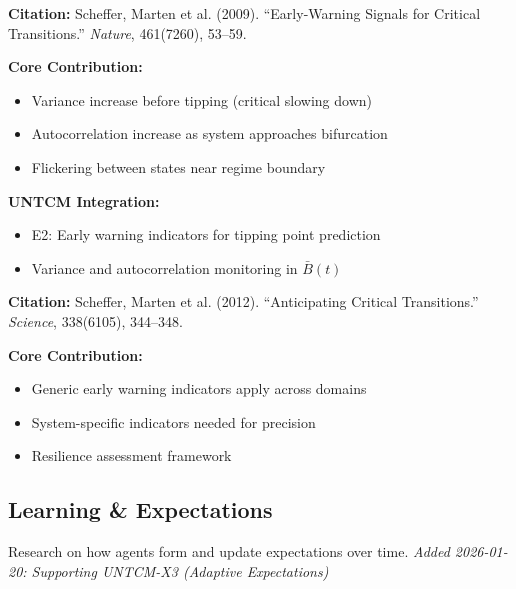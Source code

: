 \begin{tcolorbox}[colback=yellow!5!white,colframe=yellow!75!black,title=Key Paper: Scheffer et al. (2009)]
\textbf{Citation:} Scheffer, Marten et al. (2009). ``Early-Warning Signals for Critical Transitions.'' \textit{Nature}, 461(7260), 53--59.

\textbf{Core Contribution:}
\begin{itemize}[nosep]
    \item Variance increase before tipping (critical slowing down)
    \item Autocorrelation increase as system approaches bifurcation
    \item Flickering between states near regime boundary
\end{itemize}

\textbf{UNTCM Integration:}
\begin{itemize}[nosep]
    \item E2: Early warning indicators for tipping point prediction
    \item Variance and autocorrelation monitoring in $\bar{B}(t)$
\end{itemize}
\end{tcolorbox}

\begin{tcolorbox}[colback=yellow!5!white,colframe=yellow!75!black,title=Key Paper: Scheffer et al. (2012)]
\textbf{Citation:} Scheffer, Marten et al. (2012). ``Anticipating Critical Transitions.'' \textit{Science}, 338(6105), 344--348.

\textbf{Core Contribution:}
\begin{itemize}[nosep]
    \item Generic early warning indicators apply across domains
    \item System-specific indicators needed for precision
    \item Resilience assessment framework
\end{itemize}
\end{tcolorbox}

\subsection{Learning \& Expectations}
\label{subsec:ot-learning}

Research on how agents form and update expectations over time.
\textit{Added 2026-01-20: Supporting UNTCM-X3 (Adaptive Expectations)}

